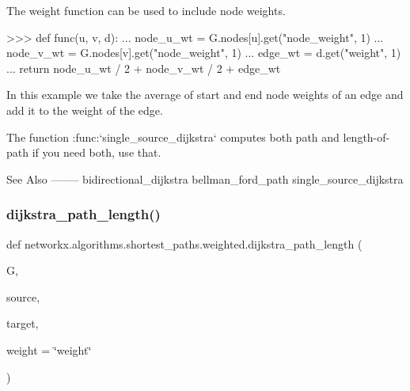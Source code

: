 \begin{DoxyVerb}
The weight function can be used to include node weights.

>>> def func(u, v, d):
...     node_u_wt = G.nodes[u].get("node_weight", 1)
...     node_v_wt = G.nodes[v].get("node_weight", 1)
...     edge_wt = d.get("weight", 1)
...     return node_u_wt / 2 + node_v_wt / 2 + edge_wt

In this example we take the average of start and end node
weights of an edge and add it to the weight of the edge.

The function :func:`single_source_dijkstra` computes both
path and length-of-path if you need both, use that.

See Also
--------
bidirectional_dijkstra
bellman_ford_path
single_source_dijkstra
\end{DoxyVerb}
 \mbox{\label{namespacenetworkx_1_1algorithms_1_1shortest__paths_1_1weighted_a01a179e91d8496dabf25682da89b575b}} 
\subsubsection{\texorpdfstring{dijkstra\+\_\+path\+\_\+length()}{dijkstra\_path\_length()}}
{\footnotesize\ttfamily def networkx.\+algorithms.\+shortest\+\_\+paths.\+weighted.\+dijkstra\+\_\+path\+\_\+length (\begin{DoxyParamCaption}\item[{}]{G,  }\item[{}]{source,  }\item[{}]{target,  }\item[{}]{weight = {\ttfamily \char`\"{}weight\char`\"{}} }\end{DoxyParamCaption})}

